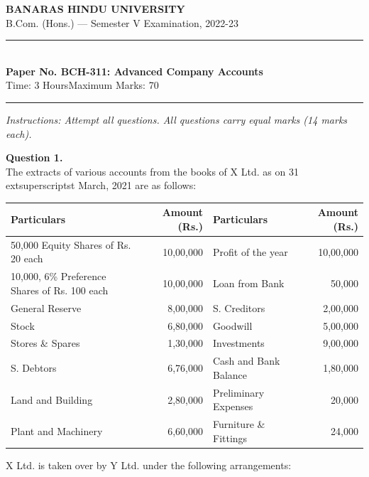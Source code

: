\documentclass[11pt,a4paper]{article}
\begin{document}
\begin{center}
  {\large\bfseries BANARAS HINDU UNIVERSITY}\\[2pt]
  {\normalsize B.Com. (Hons.) --- Semester V Examination, 2022-23}\\[6pt]
  \rule{0.8\linewidth}{0.5pt}\\[6pt]
  {\large\bfseries Paper No. BCH-311: Advanced Company Accounts}\\[4pt]
  {\normalsize Time: 3 Hours\hfill Maximum Marks: 70}
\end{center}

\rule{\linewidth}{0.4pt}

\smallskip



\noindent   \textit{Instructions: Attempt all questions. All questions carry equal marks (14 marks each).}

\bigskip




\noindent   \textbf{Question 1.} \\
The extracts of various accounts from the books of X Ltd. as on 31 extsuperscript{st} March, 2021 are as follows:

\begin{center}
  
\begin{tabular}{|p{4.3cm}|r|p{4.3cm}|r|}
    \hline
   \textbf{Particulars} &   \textbf{Amount (Rs.)} &   \textbf{Particulars} &   \textbf{Amount (Rs.)} \\ \hline
    \raggedright 50,000 Equity Shares of Rs. 20 each & 10,00,000 & \raggedright Profit of the year & 10,00,000 \\
    \raggedright 10,000, 6\% Preference Shares of Rs. 100 each & 10,00,000 & \raggedright Loan from Bank & 50,000 \\
    \raggedright General Reserve & 8,00,000 & \raggedright S. Creditors & 2,00,000 \\
    \raggedright Stock & 6,80,000 & \raggedright Goodwill & 5,00,000 \\
    \raggedright Stores \& Spares & 1,30,000 & \raggedright Investments & 9,00,000 \\
    \raggedright S. Debtors & 6,76,000 & \raggedright Cash and Bank Balance & 1,80,000 \\
    \raggedright Land and Building & 2,80,000 & \raggedright Preliminary Expenses & 20,000 \\
    \raggedright Plant and Machinery & 6,60,000 & \raggedright Furniture \& Fittings & 24,000 \\ \hline
  \end{tabular}
\end{center}
X Ltd. is taken over by Y Ltd. under the following arrangements:
\end{document}
